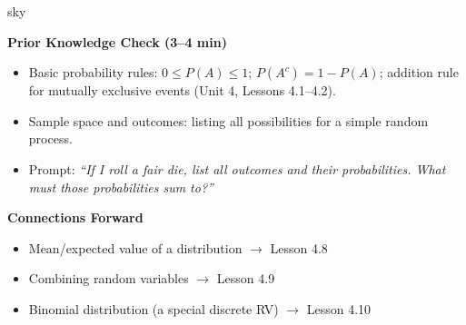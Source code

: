 \documentclass[10pt]{article}
\begin{document}
\begin{skillbox}{sky}
    \begin{minipage}[t]{0.58\linewidth}\vspace{0pt}
        \textbf{Prior Knowledge Check (3--4 min)}
        \begin{itemize}
            \item Basic probability rules: $0 \le P(A) \le 1$; $P(A^c) = 1 - P(A)$; addition
                  rule for mutually exclusive events (Unit 4, Lessons 4.1--4.2).
            \item Sample space and outcomes: listing all possibilities for a simple random
                  process.
            \item Prompt: \textit{``If I roll a fair die, list all outcomes and their
                  probabilities. What must those probabilities sum to?''}
        \end{itemize}
        \textbf{Connections Forward}
        \begin{itemize}
            \item Mean/expected value of a distribution $\to$ Lesson 4.8
            \item Combining random variables $\to$ Lesson 4.9
            \item Binomial distribution (a special discrete RV) $\to$ Lesson 4.10
        \end{itemize}
    \end{minipage}
    \hfill
    \begin{minipage}[t]{0.38\linewidth}\vspace{0pt}\centering
    \end{minipage}
\end{skillbox}
\end{document}
